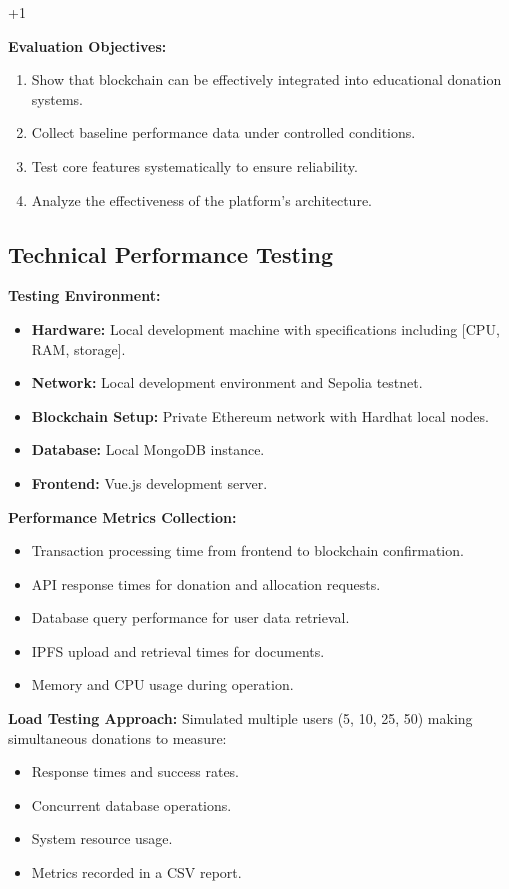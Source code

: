+1\documentclass[conference]{IEEEtran}
\begin{document}
\textbf{Evaluation Objectives:}
\begin{enumerate}
    \item Show that blockchain can be effectively integrated into educational donation systems.
    \item Collect baseline performance data under controlled conditions.
    \item Test core features systematically to ensure reliability.
    \item Analyze the effectiveness of the platform’s architecture.
\end{enumerate}

\subsection{Technical Performance Testing}
\textbf{Testing Environment:}
\begin{itemize}
    \item \textbf{Hardware:} Local development machine with specifications including [CPU, RAM, storage].
    \item \textbf{Network:} Local development environment and Sepolia testnet.
    \item \textbf{Blockchain Setup:} Private Ethereum network with Hardhat local nodes.
    \item \textbf{Database:} Local MongoDB instance.
    \item \textbf{Frontend:} Vue.js development server.
\end{itemize}

\textbf{Performance Metrics Collection:}
\begin{itemize}
    \item Transaction processing time from frontend to blockchain confirmation.
    \item API response times for donation and allocation requests.
    \item Database query performance for user data retrieval.
    \item IPFS upload and retrieval times for documents.
    \item Memory and CPU usage during operation.
\end{itemize}

\textbf{Load Testing Approach:}
Simulated multiple users (5, 10, 25, 50) making simultaneous donations to measure:
\begin{itemize}
    \item Response times and success rates.
    \item Concurrent database operations.
    \item System resource usage.
    \item Metrics recorded in a CSV report.
\end{itemize}
\end{document}
